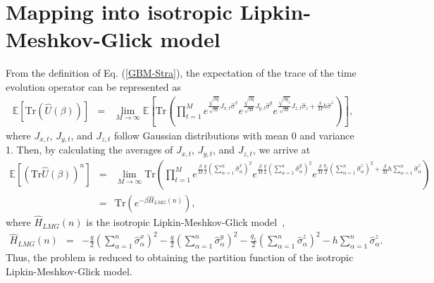 \documentclass[
aps,
pre,
showpacs
]{revtex4-1}
\newcommand{\be}{\begin{eqnarray}}
\newcommand{\ee}{\end{eqnarray}}
\newcommand{\no}{\nonumber}
\newcommand{\Tr}{\mbox{Tr} }
\begin{document}
\section{Mapping into isotropic Lipkin-Meshkov-Glick model}
From the definition of Eq. (\ref{GBM-Stra}), the expectation of the trace of the time evolution operator can be represented as
\be
\mathbb{E} \left[  \Tr \left(\hat{U}(\beta) \right) \right]&=& \lim_{M\rightarrow\infty}\mathbb{E} \left[ \Tr \left(\prod_{t=1}^M e^{ \frac{\sqrt{\beta q_{}}}{\sqrt{M}}  J_{x,t} \hat{\sigma}^x }e^{ \frac{\sqrt{\beta q_{}}}{\sqrt{M}}  J_{y,t} \hat{\sigma}^y }e^{ \frac{\sqrt{\beta q_{z}}}{\sqrt{M}}  J_{z,t} \hat{\sigma}_z +\frac{\beta}{M}  h \hat{\sigma}^z} \right) \right] ,
\ee
where $J_{x,t}$, $J_{y,t}$, and $J_{z,t}$ follow Gaussian distributions with mean 0 and variance 1.
Then, by calculating the averages of $J_{x,t}$, $J_{y,t}$, and $J_{z,t}$, we arrive at
\be
\mathbb{E} \left[ \left( \Tr \hat{U}(\beta) \right)^n\right]&=&\lim_{M\rightarrow\infty}\Tr \left( \prod_{t=1}^Me^{ \frac{\beta}{M}  \frac{q}{2} \left(\sum_{\alpha=1}^n  \hat{\sigma}_{\alpha}^x \right)^2} e^{ \frac{\beta}{M} \frac{q}{2} \left(\sum_{\alpha=1}^n  \hat{\sigma}_{\alpha}^y \right)^2 }e^{\frac{\beta}{M} \frac{q_z}{2} \left(\sum_{\alpha=1}^n  \hat{\sigma}_{\alpha}^z \right)^2
+\frac{\beta}{M} h \sum_{\alpha=1}^n  \hat{\sigma}_{\alpha}^z}\right)
\no\\
&=&\Tr \left( e^{ -\beta \hat{H}_{LMG}(n)}\right) \label{LMG-partition},
\ee
where $\hat{H}_{LMG}(n)$ is the isotropic Lipkin-Meshkov-Glick model~\cite{LMG},
\be
\hat{H}_{LMG}(n)&=&  - \frac{q}{2} \left(\sum_{\alpha=1}^n  \hat{\sigma}_{\alpha}^x \right)^2 - \frac{q}{2} \left(\sum_{\alpha=1}^n  \hat{\sigma}_{\alpha}^y \right)^2- \frac{q_z}{2} \left(\sum_{\alpha=1}^n  \hat{\sigma}_{\alpha}^z \right)^2
-h \sum_{\alpha=1}^n  \hat{\sigma}_{\alpha}^z .
\ee
Thus, the problem is reduced to obtaining the partition function of the isotropic Lipkin-Meshkov-Glick model. 
\end{document}
